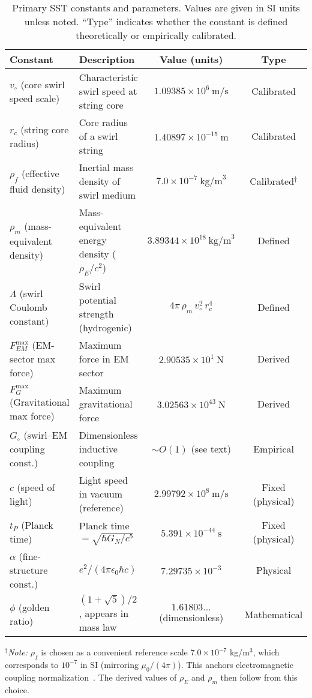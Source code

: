 \documentclass[aps,onecolumn,10pt,nofootinbib]{revtex4}
\begin{document}
	\begin{table}[ht]
		\caption{Primary SST constants and parameters. Values are given in SI units unless noted. “Type” indicates whether the constant is defined theoretically or empirically calibrated.}
		\label{tab:constants}
		\begin{ruledtabular}
			\begin{tabular}{llcc}
				\textbf{Constant} & \textbf{Description} & \textbf{Value (units)} & \textbf{Type} \\
				\hline
				$v_{\circ}$ (core swirl speed scale) & Characteristic swirl speed at string core & $1.09385\times 10^6~\text{m/s}$ & Calibrated \\
				$r_c$ (string core radius)    & Core radius of a swirl string & $1.40897\times 10^{-15}~\text{m}$ & Calibrated  \\
				$\rho_f$ (effective fluid density) & Inertial mass density of swirl medium & $7.0\times10^{-7}~\text{kg/m}^3$ & Calibrated$^{\dagger}$ \\
				$\rho_m$ (mass-equivalent density) & Mass-equivalent energy density ($\rho_E/c^2$) & $3.89344\times10^{18}~\text{kg/m}^3$ & Defined \\
				$\Lambda$ (swirl Coulomb constant) & Swirl potential strength (hydrogenic) & $4\pi\,\rho_m\,v_{\circ}^2\,r_c^4$ & Defined \\
				$F_{\!EM}^{\max}$ (EM-sector max force) & Maximum force in EM sector & $2.90535\times10^{1}~\text{N}$ & Derived \\
				$F_{\!G}^{\max}$ (Gravitational max force) & Maximum gravitational force & $3.02563\times10^{43}~\text{N}$ & Derived \\
				$G_{\circ}$ (swirl–EM coupling const.) & Dimensionless inductive coupling & $\sim O(1)$ (see text) & Empirical \\
				\hline
				$c$ (speed of light) & Light speed in vacuum (reference) & $2.99792\times10^8~\text{m/s}$ & Fixed (physical) \\
				$t_P$ (Planck time) & Planck time $=\sqrt{\hbar G_N/c^5}$ & $5.391\times10^{-44}~\text{s}$ & Fixed (physical) \\
				$\alpha$ (fine-structure const.) & $e^2/(4\pi\epsilon_0\hbar c)$ & $7.29735\times10^{-3}$ & Physical \\
				$\phi$ (golden ratio) & $(1+\sqrt{5})/2$, appears in mass law & $1.61803\ldots$ (dimensionless) & Mathematical \\
			\end{tabular}
		\end{ruledtabular}
		\begin{flushleft}
		{\footnotesize $^{\dagger}$\textit{Note:} $\rho_f$ is chosen as a convenient reference scale $7.0\times10^{-7}$ kg/m$^3$, which corresponds to $10^{-7}$ in SI (mirroring $\mu_0/(4\pi)$). This anchors electromagnetic coupling normalization~\cite{index50}. The derived values of $\rho_E$ and $\rho_m$ then follow from this choice.}
		\end{flushleft}
	\end{table}
\end{document}
